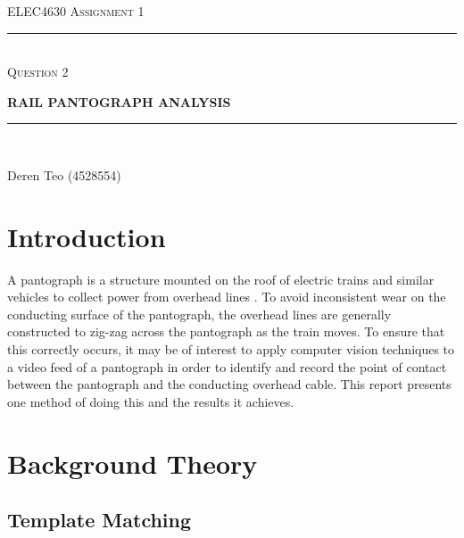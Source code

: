 \begin{titlepage}
  \centering

  \textsc{ELEC4630 Assignment 1}\\
  \vspace{9cm}

  \rule{\linewidth}{0.5pt}\\

  \vspace{1em}
  \LARGE\textsc{Question 2}\\
  \vspace{1em}

  \LARGE\uppercase{\textbf{{Rail Pantograph Analysis}}}\\

  \rule{\linewidth}{2pt}\\

  \vfill

  \normalsize{Deren Teo (4528554)}
  \vspace{1cm}

\end{titlepage}

\section{Introduction}

A pantograph is a structure mounted on the roof of electric trains and similar vehicles to collect power from overhead lines \cite{toyodenki_nd}. To avoid inconsistent wear on the conducting surface of the pantograph, the overhead lines are generally constructed to zig-zag across the pantograph as the train moves. To ensure that this correctly occurs, it may be of interest to apply computer vision techniques to a video feed of a pantograph in order to identify and record the point of contact between the pantograph and the conducting overhead cable. This report presents one method of doing this and the results it achieves.

\section{Background Theory}

\subsection{Template Matching}


